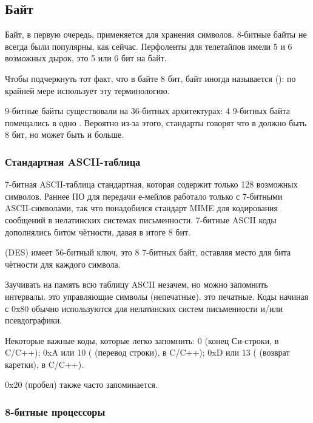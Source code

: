 \subsection{Байт}

Байт, в первую очередь, применяется для хранения символов.
8-битные байты не всегда были популярны, как сейчас.
Перфоленты для телетайпов имели 5 и 6 возможных дырок, это 5 или 6 бит на байт.

Чтобы подчеркнуть тот факт, что в байте 8 бит, байт иногда называется  ():
по крайней мере  использует эту терминологию.

9-битные байты существовали на 36-битных архитектурах: 4 9-битных байта помещались в одно .
Вероятно из-за этого, стандарты \CCpp говорят что в  должно быть  8 бит, но может быть и больше.

\subsubsection{Стандартная ASCII-таблица}

7-битная ASCII-таблица стандартная, которая содержит только 128 возможных символов.
Раннее ПО для передачи е-мейлов работало только с 7-битными ASCII-символами, так что понадобился стандарт \ac{MIME}
для кодирования сообщений в нелатинских системах письменности.
7-битные ASCII коды дополнялись битом чётности, давая в итоге 8 бит.

 (\ac{DES}) имеет 56-битный ключ, это 8 7-битных байт,
оставляя место для бита чётности для каждого символа.

Заучивать на память всю таблицу \ac{ASCII} незачем, но можно запомнить интервалы.
 это управляющие символы (непечатные).
 это печатные.
Коды начиная с 0x80 обычно используются для нелатинских систем письменности и/или псевдографики.

Некоторые важные коды, которые легко запомнить:
0 (конец Си-строки,  в C/C++);
0xA или 10 ( (перевод строки),  в C/C++);
0xD или 13 ( (возврат каретки),  в C/C++).

0x20 (пробел) также часто запоминается.

\subsubsection{8-битные процессоры}

